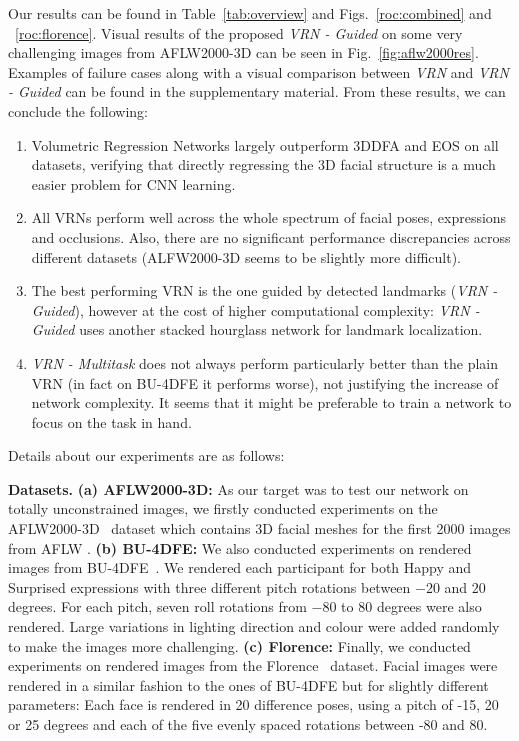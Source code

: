 Our results can be found in Table~\ref{tab:overview} and
Figs.~\ref{roc:combined} and ~\ref{roc:florence}.
Visual results of the proposed \textit{VRN - Guided} on some very
challenging images from AFLW2000-3D can be seen in
Fig.~\ref{fig:aflw2000res}. Examples of failure cases along with a visual comparison between \textit{VRN} and \textit{VRN - Guided} can be found in the supplementary material. From these results, we can conclude the
following:
\begin{enumerate}
\item
Volumetric Regression Networks largely outperform 3DDFA and EOS on all datasets, verifying that directly regressing the 3D facial structure is a much easier problem for CNN learning.
\item
All VRNs perform well across the whole spectrum of facial poses, expressions and occlusions. Also, there are no significant performance discrepancies across different datasets (ALFW2000-3D seems to be slightly more difficult).
\item The best performing VRN is the one guided by detected landmarks
  (\textit{VRN - Guided}), however at the cost of higher computational
  complexity: \textit{VRN - Guided} uses another stacked hourglass network for
  landmark localization.
\item
\textit{VRN - Multitask} does not always perform particularly better than the plain VRN (in fact on BU-4DFE it performs worse), not justifying the increase of network complexity. It seems that it might be preferable to train a network to focus on the task in hand.
\end{enumerate}



\noindent{}Details about our experiments are as follows:

\textbf{Datasets.} \textbf{(a) AFLW2000-3D:} As our target
was to test our network on totally unconstrained images, we firstly
conducted experiments on the AFLW2000-3D~\cite{zhu2016face} dataset
which contains 3D facial meshes for the first 2000 images from AFLW
\cite{aflw2011}. \textbf{(b) BU-4DFE:} We also conducted
experiments on rendered images from BU-4DFE~\cite{yin2008high}. We
rendered each participant for both Happy and Surprised expressions
with three different pitch rotations between $-20$ and $20$
degrees. For each pitch, seven roll rotations from $-80$ to $80$
degrees were also rendered. Large variations in lighting direction and
colour were added randomly to make the images more challenging.   \textbf{(c) Florence:} Finally,
we conducted experiments on rendered images from the
Florence~\cite{masi2d3dFaceData} dataset. Facial images were rendered
in a similar fashion to the ones of BU-4DFE but for slightly different
parameters: Each face is rendered in 20 difference poses, using a
pitch of -15, 20 or 25 degrees and each of the five evenly spaced
rotations between -80 and 80. 

